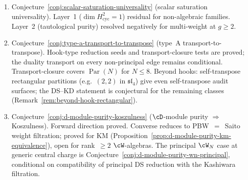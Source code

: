 \begin{remark}
\begin{enumerate}
 Three-layer gap (sewing envelope, conformally flat $2$-disk, coderived shadow). Proved for Heisenberg and lattice VOAs.
\item \textup{Conjecture~\ref{conj:scalar-saturation-universality} (scalar saturation universality).}
 Layer~1 ($\dim H^2_{\mathrm{cyc}} = 1$) residual for non-algebraic families.
 Layer~2 (tautological purity) resolved negatively for multi-weight at $g \geq 2$.
\item \textup{Conjecture~\ref{conj:type-a-transport-to-transpose} (type~A transport-to-transpose).}
 Hook-type reduction seeds and transport-closure tests are proved;
 the duality transport on every non-principal edge remains conditional.
 Transport-closure covers $\operatorname{Par}(N)$ for $N \leq 8$.
 Beyond hooks: self-transpose rectangular partitions
 (e.g.\ $(2,2)$ in $\mathfrak{sl}_4$) give even self-transpose
 audit surfaces; the DS--KD statement is conjectural for the
 remaining classes
 (Remark~\ref{rem:beyond-hook-rectangular}).
\item \textup{Conjecture~\ref{conj:d-module-purity-koszulness} ($\cD$-module purity $\Rightarrow$ Koszulness).}
 Forward direction proved. Converse reduces to PBW~$=$~Saito weight filtration;
 proved for KM (Proposition~\ref{prop:d-module-purity-km-equivalence}), open for rank~$\geq 2$
 $\cW$-algebras. The principal $\cW_N$ case at generic central charge
 is Conjecture~\ref{conj:d-module-purity-wn-principal}, conditional on
 compatibility of principal DS reduction with the Kashiwara filtration.
\end{enumerate}
\end{remark}

